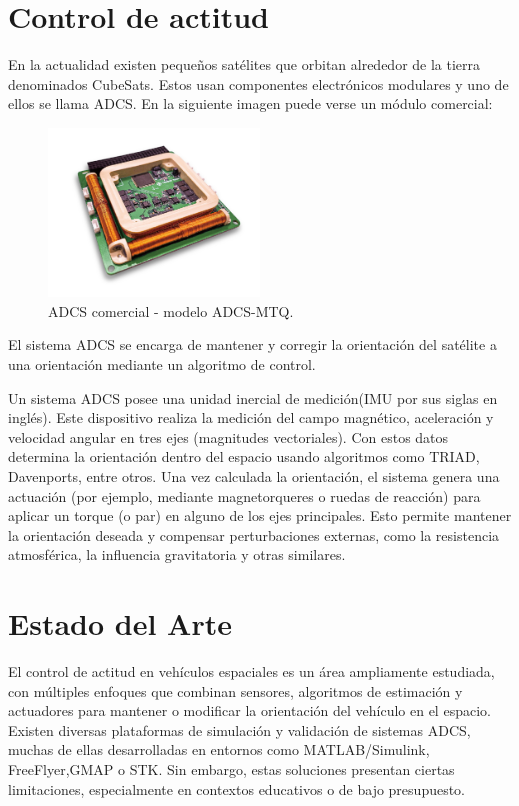 \section{Control de actitud}
En la actualidad existen pequeños satélites que orbitan alrededor de la tierra denominados CubeSats. Estos usan componentes electrónicos modulares y uno de ellos se llama ADCS. En la siguiente imagen puede verse un módulo comercial: 
\begin{figure}[htbp]
	\centering
	\includegraphics[width=0.5\textwidth]{./Figures/ADCS-Commercial.jpg}
	\caption{ADCS comercial - modelo ADCS-MTQ.}
	\label{fig:adcs_commercial}
\end{figure}


El sistema ADCS se encarga de mantener y corregir  la orientación del satélite a una orientación mediante un algoritmo de control. 

Un sistema ADCS posee una unidad inercial de medición(IMU por sus siglas en inglés). Este dispositivo realiza la medición del campo magnético, aceleración y velocidad angular en tres ejes (magnitudes vectoriales). 
Con estos datos  determina la orientación dentro del espacio usando algoritmos como TRIAD, Davenports, entre otros.
Una vez calculada la orientación, el sistema genera una actuación (por ejemplo, mediante magnetorqueres o ruedas de reacción) para aplicar un torque (o par) en alguno de los ejes principales. Esto permite mantener la orientación deseada y compensar perturbaciones externas, como la resistencia atmosférica, la influencia gravitatoria y otras similares. 


\section{Estado del Arte}

El control de actitud en vehículos espaciales es un área ampliamente estudiada, con múltiples enfoques que combinan sensores, algoritmos de estimación y actuadores para mantener o modificar la orientación del vehículo en el espacio. Existen diversas plataformas de simulación y validación de sistemas ADCS, muchas de ellas desarrolladas en entornos como MATLAB/Simulink, FreeFlyer,GMAP o STK. Sin embargo, estas soluciones presentan ciertas limitaciones, especialmente en contextos educativos o de bajo presupuesto.

